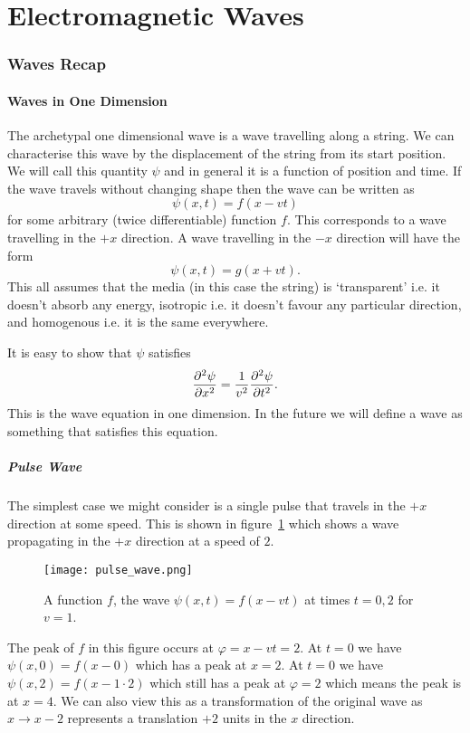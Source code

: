 
    \part{Electromagnetic Waves}
    \section{Waves Recap}
    \subsection{Waves in One Dimension}
    The archetypal one dimensional wave is a wave travelling along a string.
    We can characterise this wave by the displacement of the string from its start position.
    We will call this quantity \(\psi\) and in general it is a function of position and time.
    If the wave travels without changing shape then the wave can be written as
    \[\psi(x, t) = f(x - vt)\]
    for some arbitrary (twice differentiable) function \(f\).
    This corresponds to a wave travelling in the \(+x\) direction.
    A wave travelling in the \(-x\) direction will have the form
    \[\psi(x, t) = g(x + vt).\]
    This all assumes that the media (in this case the string) is `transparent' i.e. it doesn't absorb any energy, isotropic i.e. it doesn't favour any particular direction, and homogenous i.e. it is the same everywhere.
    
    It is easy to show that \(\psi\) satisfies
    \[\pdv[2]{\psi}{x} = \frac{1}{v^2}\pdv[2]{\psi}{t}.\]
    This is the wave equation in one dimension.
    In the future we will define a wave as something that satisfies this equation.
    
    \subsubsection{Pulse Wave}
    The simplest case we might consider is a single pulse that travels in the \(+x\) direction at some speed.
    This is shown in figure~\ref{fig:pulse wave} which shows a wave propagating in the \(+x\) direction at a speed of \(2\).
    \begin{figure}[ht]
        \centering
        \texttt{[image: pulse\_wave.png]}
        \caption{A function \(f\), the wave \(\psi(x, t) = f(x - vt)\) at times \(t = 0, 2\) for \(v = 1\).}
        \label{fig:pulse wave}
    \end{figure}
    The peak of \(f\) in this figure occurs at \(\varphi = x - vt = 2\).
    At \(t = 0\) we have \(\psi(x, 0) = f(x - 0)\) which has a peak at \(x = 2\).
    At \(t = 0\) we have \(\psi(x, 2) = f(x - 1\cdot 2)\) which still has a peak at \(\varphi = 2\) which means the peak is at \(x = 4\).
    We can also view this as a transformation of the original wave as \(x \to x - 2\) represents a translation \(+2\) units in the \(x\) direction.
    
